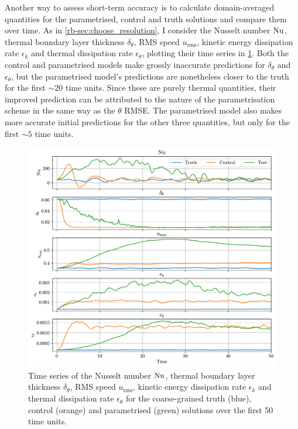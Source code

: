 \documentclass[../main.tex]{subfiles}
\begin{document}
Another way to assess short-term accuracy is to calculate domain-averaged
quantities for the parametrised, control and truth solutions and compare them
over time. As in \cref{rb-sec:choose_resolution}, I consider the Nusselt number
$\mathrm{Nu}$, thermal boundary layer thickness $\delta_\theta$, RMS speed
$u_\mathrm{rms}$, kinetic energy dissipation rate $\epsilon_k$ and thermal
dissipation rate $\epsilon_\theta$, plotting their time series in
\cref{fig:short_term_metrics}. Both the control and parametrised models make
grossly inaccurate predictions for $\delta_\theta$ and $\epsilon_\theta$, but
the parametrised model's predictions are nonetheless closer to the truth for
the first $\sim 20$ time units. Since these are purely thermal quantities,
their improved prediction can be attributed to the nature of the
parametrisation scheme in the same way as the $\theta$ RMSE. The parametrised
model also makes more accurate initial predictions for the other three
quantities, but only for the first $\sim 5$ time units.

\begin{figure}[ht]
    \centering
    \includegraphics[width=\linewidth]{figures/short_term_metrics.pdf}
    \caption{
        Time series of the Nusselt number $\mathrm{Nu}$, thermal boundary layer
        thickness $\delta_\theta$, RMS speed $u_\mathrm{rms}$, kinetic energy
        dissipation rate $\epsilon_k$ and thermal dissipation rate
        $\epsilon_\theta$ for the coarse-grained truth (blue), control (orange)
        and parametrised (green) solutions over the first 50 time units.
    }
    \label{fig:short_term_metrics}
\end{figure}
\end{document}
